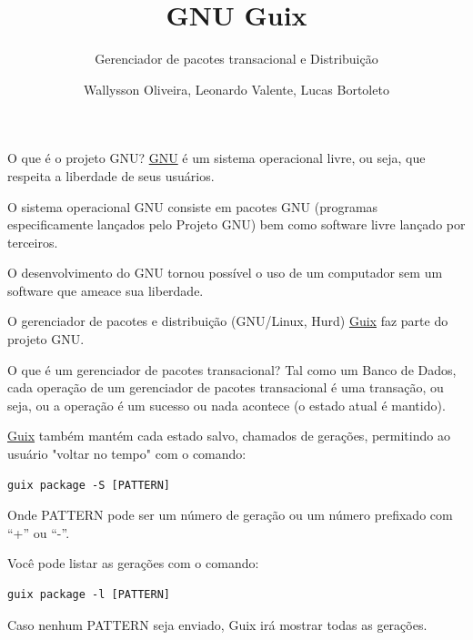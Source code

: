 \documentclass[bigger]{beamer}
\author{Wallysson Oliveira, Leonardo Valente, Lucas Bortoleto}
\date{}
\title{GNU Guix}
\subtitle{Gerenciador de pacotes transacional e Distribuição}
\begin{document}
\maketitle
\begin{frame}[label={sec:org6526a3f}]{O que é o projeto GNU?}
\href{https://www.gnu.org/home.en.html}{GNU} é um sistema operacional livre, ou seja, que respeita a liberdade de seus usuários.

O sistema operacional GNU consiste em pacotes GNU (programas especificamente lançados pelo Projeto GNU)
bem como software livre lançado por terceiros.

O desenvolvimento do GNU tornou possível o uso de um computador sem um software que ameace sua liberdade.

O gerenciador de pacotes e distribuição (GNU/Linux, Hurd) \href{https://guix.gnu.org/}{Guix} faz parte do projeto GNU.
\end{frame}
\begin{frame}[label={sec:org1ddcac0},fragile]{O que é um gerenciador de pacotes transacional?}
 Tal como um Banco de Dados, cada operação de um gerenciador de pacotes transacional é uma transação, ou seja,
ou a operação é um sucesso ou nada acontece (o estado atual é mantido).

\href{https://guix.gnu.org/manual/en/html\_node/Package-Management.html}{Guix} também mantém cada estado salvo, chamados de gerações, permitindo ao usuário "voltar no tempo" com
o comando:
\begin{verbatim}
guix package -S [PATTERN]
\end{verbatim}
Onde PATTERN pode ser um número de geração ou um número prefixado com “+” ou “-”.

Você pode listar as gerações com o comando:
\begin{verbatim}
guix package -l [PATTERN]
\end{verbatim}
Caso nenhum PATTERN seja enviado, Guix irá mostrar todas as gerações.
\end{frame}
\end{document}
